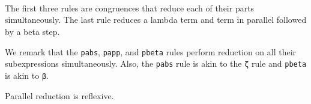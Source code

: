 \begin{fence}
\begin{code}
\<%
\\
%
\>[4]%
\>[143I]\AgdaSpace{}%
\AgdaSpace{}%
\<%
\\
\>[.][@{}l@{}]\<[143I]%
\>[6]\AgdaComment{-----------------------}\<%
\\
%
\>[4]\AgdaSpace{}%
\AgdaSymbol{(}\AgdaSpace{}%
\AgdaSymbol{)}\AgdaSpace{}%
\AgdaSpace{}%
%
\>[17]%
\>[20]\AgdaSpace{}%
\AgdaOperator{\AgdaFunction{[}}\AgdaSpace{}%
\AgdaSpace{}%
\AgdaOperator{\AgdaFunction{]}}\<%
\end{code}
\end{fence}

The first three rules are congruences that reduce each of their parts
simultaneously. The last rule reduces a lambda term and term in parallel
followed by a beta step.

We remark that the \texttt{pabs}, \texttt{papp}, and \texttt{pbeta}
rules perform reduction on all their subexpressions simultaneously.
Also, the \texttt{pabs} rule is akin to the \texttt{ζ} rule and
\texttt{pbeta} is akin to \texttt{β}.

Parallel reduction is reflexive.

